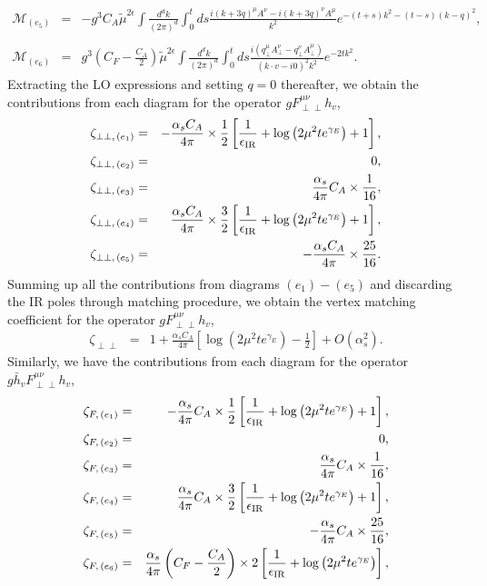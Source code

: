 \begin{eqnarray}
\label{eq:e5}
\mathcal{M}_{(e_5)} 
&=&-g^3C_A\tilde{\mu}^{2\epsilon}\int\frac{d^dk}{(2\pi)^d }\int_0^t ds\frac{i(k+3q)^{\mu}A^{\nu}-i(k+3q)^{\nu}A^{\mu}}{k^2}e^{-(t+s)k^2-(t-s)(k-q)^2},\nonumber\\\\
\mathcal{M}_{(e_6)} 
&=&g^3\left(C_F-\frac{C_A}{2}\right)\tilde{\mu}^{2\epsilon}\int\frac{d^dk}{(2\pi)^d }\int_0^t ds\frac{i\left(q^{\mu}_{\perp}A^{\nu}_{\perp}-q^{\nu}_{\perp}A^{\mu}_{\perp}\right)}{(k\cdot v-i0)^2k^2}e^{-2tk^2}.
\end{eqnarray}
Extracting the LO expressions and setting $q=0$ thereafter, we obtain the contributions from each diagram for the operator $gF^{\mu\nu}_{\perp\perp}h_v$,
\begin{eqnarray}
\label{eq:e1perpperpsimresult}
\zeta_{\perp\perp,\, (e_1)}&=&
-\frac{\alpha_sC_A}{4\pi}\times \frac{1}{2} \left[\frac{1}{\epsilon_{\rm IR}}+\log\left(2\mu^2 te^{\gamma_E}\right) +1\right],\\
\label{eq:e2perpperp}
\zeta_{\perp\perp,\, (e_2)}
&=&0,\\
\label{eq:e3perpperpresult}
\zeta_{\perp\perp,\, (e_3)}
&=&\frac{\alpha_s}{4\pi}C_A\times\frac{1}{16},\\
\label{eq:e4perpperpresult}
\zeta_{\perp\perp,\, (e_4)}&=&\frac{\alpha_sC_A}{4\pi}\times \frac{3}{2} \left[\frac{1}{\epsilon_{\rm IR}}+\log\left(2\mu^2 te^{\gamma_E}\right) +1\right],\\
\label{eq:e5perperpresult}
\zeta_{\perp\perp,\, (e_5)}
&=&- \frac{\alpha_sC_A}{4\pi}\times\frac{25}{16}.
\end{eqnarray}
Summing up all the contributions from diagrams $(e_1) - (e_5)$ and discarding the IR poles through matching procedure, we obtain the vertex matching coefficient for the operator $gF^{\mu\nu}_{\perp\perp}h_v$,
\begin{eqnarray}
\label{eq:resultgluonvertexperpperp}
\zeta_{\perp\perp} &=& 1+  \frac{\alpha_sC_A}{4\pi}\left[\log\left(2\mu^2 te^{\gamma_E}\right) -\frac{1}{2}\right]+ O(\alpha_s^2).
\end{eqnarray}
Similarly, we have the contributions from each diagram for the operator $g\bar{h}_vF^{\mu\nu}_{\perp\perp}h_v$,
\begin{eqnarray}
\zeta_{F,\, (e_1)}   &=& - \frac{\alpha_s}{4\pi}C_A\times \frac{1}{2}\left[\frac{1}{\epsilon_{\rm IR}} +\log\left(2\mu^2 te^{\gamma_E}\right) + 1\right],\\
\zeta_{F,\, (e_2)}   &=& 0,\\
\zeta_{F,\, (e_3)} &=&\frac{\alpha_s}{4\pi}C_A\times \frac{1}{16},\\
\zeta_{F,\, (e_4)}   &=&  \frac{\alpha_s}{4\pi}C_A\times \frac{3}{2}\left[\frac{1}{\epsilon_{\rm IR}} +\log\left(2\mu^2 te^{\gamma_E}\right) + 1\right],\\
\zeta_{F,\, (e_5)}   &=& - \frac{\alpha_s}{4\pi}C_A\times \frac{25}{16},\\
\zeta_{F,\, (e_6)}  &= & \frac{\alpha_s}{4\pi}\left(C_F -\frac{C_A }{2}\right)\times  2\left[\frac{1}{\epsilon_{\rm IR}} +\log\left(2\mu^2 te^{\gamma_E}\right)\right],
\end{eqnarray}  

